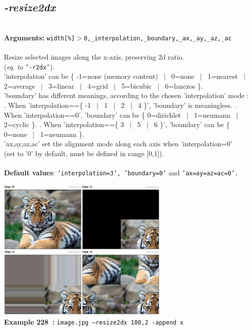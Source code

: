 \documentclass[a4paper,11pt,twoside]{book}
\begin{document}
\subsection{\emph{-resize2dx} }\vspace*{-0.5em}
~\\\textbf{Arguments: } 
{\small \texttt{width[\%]$>$0,\_interpolation,\_boundary,\_ax,\_ay,\_az,\_ac}}\\~\\
Resize selected images along the x-axis, preserving 2d ratio.
~\\(\emph{eq. to} {\small \texttt{'-r2dx'}}).
~\\'interpolation' can be \{ -1=none (memory content) ~$|$~ 0=none ~$|$~ 1=nearest ~$|$~ 2=average ~$|$~ 3=linear ~$|$~ 4=grid ~$|$~ 5=bicubic ~$|$~ 6=lanczos \}.
~\\'boundary' has different meanings, according to the chosen 'interpolation' mode :
. When 'interpolation==\{ -1 ~$|$~ 1 ~$|$~ 2 ~$|$~ 4 \}', 'boundary' is meaningless.
. When 'interpolation==0', 'boundary' can be \{ 0=dirichlet ~$|$~ 1=neumann ~$|$~ 2=cyclic \}.
. When 'interpolation==\{ 3 ~$|$~ 5 ~$|$~ 6 \}', 'boundary' can be \{ 0=none ~$|$~ 1=neumann \}.
~\\'ax,ay,az,ac' set the alignment mode along each axis when 'interpolation=0'
~\\(set to '0' by default, must be defined in range [0,1]).
~\\~\\\textbf{Default values}: {\small \texttt{'interpolation=3', 'boundary=0'} and \texttt{'ax=ay=az=ac=0'.}}
\begin{center}\includegraphics[keepaspectratio=true,height=7cm,width=\textwidth]{img/gmic_def228.jpg}\\
{\footnotesize \textbf{Example 228~:} \texttt{image.jpg --resize2dx 100,2 -append x}}
\end{center}
\end{document}
